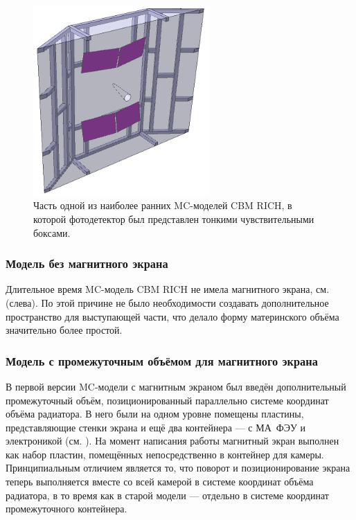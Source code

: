 \begin{figure}[H]
\centering
\includegraphics[width=0.6\textwidth]{pictures/PrimitivePhotodetector.png}
\caption{Часть одной из наиболее ранних MC-моделей CBM RICH, в которой фотодетектор был представлен тонкими чувствительными боксами.}
\label{fig:PrimitivePhotodetector}
\end{figure}

\subsubsection{Модель без магнитного экрана}\label{sec:secNoMagScreen}

Длительное время MC-модель CBM RICH не имела магнитного экрана, см. (слева). По этой причине не было необходимости создавать дополнительное пространство для выступающей части, что делало форму материнского объёма значительно более простой.

\subsubsection{Модель с промежуточным объёмом для магнитного экрана}\label{sec:secInterVolMagScreen}

В первой версии MC-модели с магнитным экраном был введён дополнительный промежуточный объём, позиционированный параллельно системе координат объёма радиатора. В него были на одном уровне помещены пластины, представляющие стенки экрана и ещё два контейнера --- с МА~ФЭУ и электроникой (см. ). На момент написания работы магнитный экран выполнен как набор пластин, помещённых непосредственно в контейнер для камеры. Принципиальным отличием является то, что поворот и позиционирование экрана теперь выполняется вместе со всей камерой в системе координат объёма радиатора, в то время как в старой модели --- отдельно в системе координат промежуточного контейнера.

